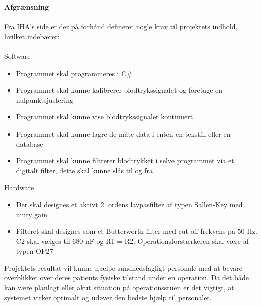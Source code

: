 \textbf{Afgrænsning}\\ \\
Fra IHA’s side er der på forhånd defineret nogle krav til projektets indhold, hvilket indebærer:\\ \\
Software 
\begin{itemize}
	\item Programmet skal programmeres i C\#
	\item Programmet skal kunne kalibrerer blodtrykssignalet og foretage en nulpunktsjustering
	\item Programmet skal kunne vise blodtrykssignalet kontinuert
	\item Programmet skal kunne lagre de måte data i enten en tekstfil eller en database
	\item Programmet skal kunne filtrerer blodtrykket i selve programmet via et digitalt filter, dette skal kunne slås til og fra
\end{itemize}

Hardware
\begin{itemize}
	\item Der skal designes et aktivt 2. ordens lavpasfilter af typen Sallen-Key med unity gain
	\item Filteret skal designes som et Butterworth filter med cut off frekvens på 50 Hz. C2 skal vælges til 680 nF og R1 = R2. Operationsforstærkeren skal være af typen OP27
\end{itemize}
Projektets resultat vil kunne hjælpe sundhedsfagligt personale med at bevare overblikket over deres patients fysiske tilstand under en operation. Da det både kan være planlagt eller akut situation på operationsstuen er det vigtigt, at systemet virker optimalt og udøver den bedste hjælp til personalet.
